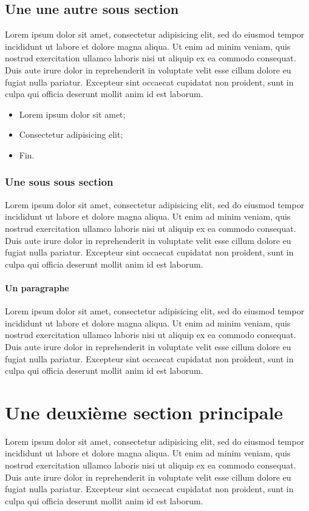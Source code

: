 \subsection{Une une autre sous section}
Lorem ipsum dolor sit amet, consectetur adipisicing elit, sed do eiusmod
tempor incididunt ut labore et dolore magna aliqua. Ut enim ad minim veniam,
quis nostrud exercitation ullamco laboris nisi ut aliquip ex ea commodo
consequat. Duis aute irure dolor in reprehenderit in voluptate velit esse
cillum dolore eu fugiat nulla pariatur. Excepteur sint occaecat cupidatat non
proident, sunt in culpa qui officia deserunt mollit anim id est laborum.

\begin{itemize}
	\item Lorem ipsum dolor sit amet;
	\item Consectetur adipisicing elit;
	\item Fin.
\end{itemize}

\subsubsection{Une sous sous section}
Lorem ipsum dolor sit amet, consectetur adipisicing elit, sed do eiusmod
tempor incididunt ut labore et dolore magna aliqua. Ut enim ad minim veniam,
quis nostrud exercitation ullamco laboris nisi ut aliquip ex ea commodo
consequat. Duis aute irure dolor in reprehenderit in voluptate velit esse
cillum dolore eu fugiat nulla pariatur. Excepteur sint occaecat cupidatat non
proident, sunt in culpa qui officia deserunt mollit anim id est laborum.

\paragraph{Un paragraphe}
Lorem ipsum dolor sit amet, consectetur adipisicing elit, sed do eiusmod
tempor incididunt ut labore et dolore magna aliqua. Ut enim ad minim veniam,
quis nostrud exercitation ullamco laboris nisi ut aliquip ex ea commodo
consequat. Duis aute irure dolor in reprehenderit in voluptate velit esse
cillum dolore eu fugiat nulla pariatur. Excepteur sint occaecat cupidatat non
proident, sunt in culpa qui officia deserunt mollit anim id est laborum.

\section{Une deuxième section principale}
Lorem ipsum dolor sit amet, consectetur adipisicing elit, sed do eiusmod
tempor incididunt ut labore et dolore magna aliqua. Ut enim ad minim veniam,
quis nostrud exercitation ullamco laboris nisi ut aliquip ex ea commodo
consequat. Duis aute irure dolor in reprehenderit in voluptate velit esse
cillum dolore eu fugiat nulla pariatur. Excepteur sint occaecat cupidatat non
proident, sunt in culpa qui officia deserunt mollit anim id est laborum.

